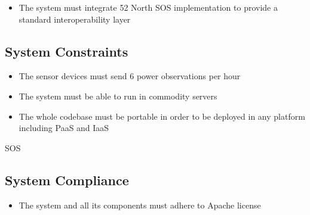 \begin{itemize}
	\item The system must integrate 52 North SOS implementation to provide a standard interoperability layer
\end{itemize}

\subsection{System Constraints}

\begin{itemize}
	\item The sensor devices must send 6 power observations per hour
	\item The system must be able to run in commodity servers 
	\item The whole codebase must be portable in order to be deployed in any platform including PaaS and IaaS
\end{itemize}

SOS

\subsection{System Compliance}

\begin{itemize}
	\item The system and all its components must adhere to Apache license
\end{itemize}




